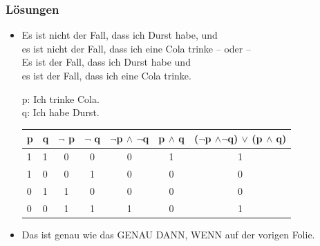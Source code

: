 \begin{frame}
\frametitle{Lösungen}


%	
\begin{itemize}
\item[] 
Es ist nicht der Fall, dass ich Durst habe, und\\
es ist nicht der Fall, dass ich eine Cola trinke -- oder -- \\
Es ist der Fall, dass ich Durst habe und\\
es ist der Fall, dass ich eine Cola trinke.\\

\medskip

p: Ich trinke Cola.\\
q: Ich habe Durst.

\bigskip

\begin{tabular}{l|l|c|c|c|c|c}
p & q & $\lnot$ p & $\lnot$ q & $ \lnot $p $ \land$ $\lnot $q & p $ \land $ q & ($ \lnot $p $ \land \lnot $q) $ \lor $ (p $ \land $ q)\\
\hline
1 & 1 & 0& 0 & 0 & 1 & 1\\
\hline
1 & 0 & 0 & 1 &  0 & 0 & 0\\
\hline
0 & 1 & 1 & 0 & 0 & 0 & 0\\
\hline
0 & 0 & 1 & 1 & 1 & 0 & 1\\
\end{tabular}

\bigskip

\item[] Das ist genau wie das GENAU DANN, WENN auf der vorigen Folie.

\end{itemize}

\end{frame}

